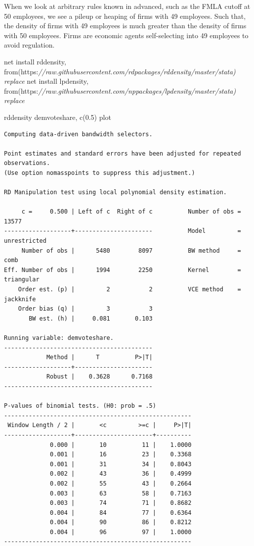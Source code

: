 \documentclass[
]{book}
\newenvironment{Shaded}{\begin{snugshade}}{\end{snugshade}}
\newcommand{\CommentTok}[1]{\textcolor[rgb]{0.56,0.35,0.01}{\textit{#1}}}
\newcommand{\NormalTok}[1]{#1}
\begin{document}
When we look at arbitrary rules known in advanced, such as the FMLA cutoff at 50 employees, we see a pileup or heaping of firms with 49 employees. Such that, the density of firms with 49 employees is much greater than the density of firms with 50 employees. Firms are economic agents self-selecting into 49 employees to avoid regulation.

\begin{Shaded}
\begin{Highlighting}[]
\NormalTok{net install rddensity, from(https:}\CommentTok{//raw.githubusercontent.com/rdpackages/rddensity/master/stata) replace}
\NormalTok{net install lpdensity, from(https:}\CommentTok{//raw.githubusercontent.com/nppackages/lpdensity/master/stata) replace}
\end{Highlighting}
\end{Shaded}

\begin{Shaded}
\begin{Highlighting}[]
\NormalTok{rddensity demvoteshare, c(0.5) plot}
\end{Highlighting}
\end{Shaded}

\begin{verbatim}
Computing data-driven bandwidth selectors.

Point estimates and standard errors have been adjusted for repeated observations.
(Use option nomasspoints to suppress this adjustment.)

RD Manipulation test using local polynomial density estimation.

     c =     0.500 | Left of c  Right of c          Number of obs =        13577
-------------------+----------------------          Model         = unrestricted
     Number of obs |      5480        8097          BW method     =         comb
Eff. Number of obs |      1994        2250          Kernel        =   triangular
    Order est. (p) |         2           2          VCE method    =    jackknife
    Order bias (q) |         3           3
       BW est. (h) |     0.081       0.103

Running variable: demvoteshare.
------------------------------------------
            Method |      T          P>|T|
-------------------+----------------------
            Robust |    0.3628      0.7168
------------------------------------------

P-values of binomial tests. (H0: prob = .5)
-----------------------------------------------------
 Window Length / 2 |       <c         >=c |     P>|T|
-------------------+----------------------+----------
             0.000 |       10          11 |    1.0000
             0.001 |       16          23 |    0.3368
             0.001 |       31          34 |    0.8043
             0.002 |       43          36 |    0.4999
             0.002 |       55          43 |    0.2664
             0.003 |       63          58 |    0.7163
             0.003 |       74          71 |    0.8682
             0.004 |       84          77 |    0.6364
             0.004 |       90          86 |    0.8212
             0.004 |       96          97 |    1.0000
-----------------------------------------------------
\end{verbatim}
\end{document}
